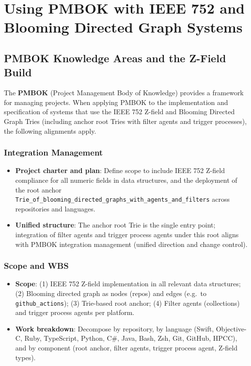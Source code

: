 \chapter{Using PMBOK with IEEE 752 and Blooming Directed Graph Systems}
\label{ch:pmbok-integration}

\section{PMBOK Knowledge Areas and the Z-Field Build}

The \textbf{PMBOK} (Project Management Body of Knowledge) provides a framework for managing projects. When applying PMBOK to the implementation and specification of systems that use the IEEE 752 Z-field and Blooming Directed Graph Tries (including anchor root Tries with filter agents and trigger processes), the following alignments apply.

\subsection{Integration Management}

\begin{itemize}
    \item \textbf{Project charter and plan}: Define scope to include IEEE 752 Z-field compliance for all numeric fields in data structures, and the deployment of the root anchor \texttt{Trie\_of\_blooming\_directed\_graphs\_with\_agents\_and\_filters} across repositories and languages.
    \item \textbf{Unified structure}: The anchor root Trie is the single entry point; integration of filter agents and trigger process agents under this root aligns with PMBOK integration management (unified direction and change control).
\end{itemize}

\subsection{Scope and WBS}

\begin{itemize}
    \item \textbf{Scope}: (1) IEEE 752 Z-field implementation in all relevant data structures; (2) Blooming directed graph as nodes (repos) and edges (e.g.\ to \texttt{github\_actions}); (3) Trie-based root anchor; (4) Filter agents (collections) and trigger process agents per platform.
    \item \textbf{Work breakdown}: Decompose by repository, by language (Swift, Objective-C, Ruby, TypeScript, Python, C\#, Java, Bash, Zsh, Git, GitHub, HPCC), and by component (root anchor, filter agents, trigger process agent, Z-field types).
\end{itemize}

